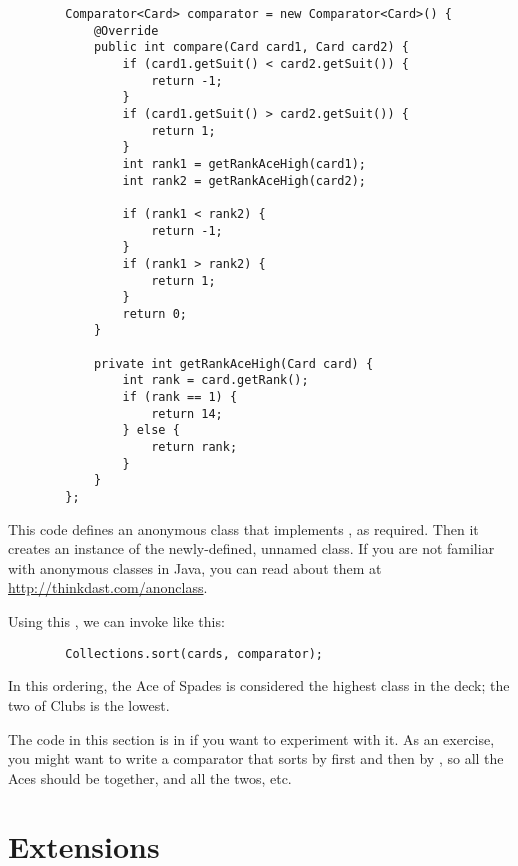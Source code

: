 \documentclass[12pt]{book}
\theoremstyle{exercise}
\begin{document}
\begin{verbatim}
        Comparator<Card> comparator = new Comparator<Card>() {
            @Override
            public int compare(Card card1, Card card2) {
                if (card1.getSuit() < card2.getSuit()) {
                    return -1;
                }
                if (card1.getSuit() > card2.getSuit()) {
                    return 1;
                }
                int rank1 = getRankAceHigh(card1);
                int rank2 = getRankAceHigh(card2);

                if (rank1 < rank2) {
                    return -1;
                }
                if (rank1 > rank2) {
                    return 1;
                }
                return 0;
            }

            private int getRankAceHigh(Card card) {
                int rank = card.getRank();
                if (rank == 1) {
                    return 14;
                } else {
                    return rank;
                }
            }
        };
\end{verbatim}

This code defines an anonymous class that implements ,
as required. Then it creates an instance of the newly-defined, unnamed
class. If you are not familiar with anonymous classes in Java, you can
read about them at \url{http://thinkdast.com/anonclass}.


Using this , we can invoke  like this:

\begin{verbatim}
        Collections.sort(cards, comparator);
\end{verbatim}

In this ordering, the Ace of Spades is considered the highest class in
the deck; the two of Clubs is the lowest.


The code in this section is in  if you want to
experiment with it. As an exercise, you might want to write a comparator
that sorts by  first and then by , so all the
Aces should be together, and all the twos, etc.


\section{Extensions}
\label{extensions}

\end{document}
